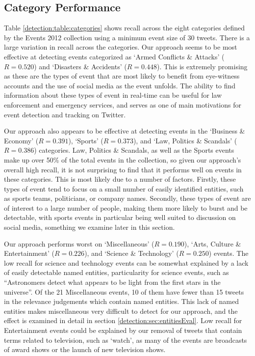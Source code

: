 \subsection{Category Performance}
Table \ref{detection:table:categories} shows recall across the eight categories defined by the Events 2012 collection using a minimum event size of 30 tweets.
There is a large variation in recall across the categories.
Our approach seems to be most effective at detecting events categorized as  `Armed Conflicts \& Attacks' ($R=0.520$) and `Disasters \& Accidents' ($R=0.448$).
This is extremely promising as these are the types of event that are most likely to benefit from eye-witness accounts and the use of social media as the event unfolds.
The ability to find information about these types of event in real-time can be useful for law enforcement and emergency services, and serves as one of main motivations for event detection and tracking on Twitter.

Our approach also appears to be effective at detecting events in the `Business \& Economy' ($R=0.391$), `Sports' ($R=0.373$), and `Law, Politics \& Scandals' ($R=0.386$) categories.
Law, Politics \& Scandals, as well as the Sports events make up over 50\% of the total events in the collection, so given our approach's overall high recall, it is not surprising to find that it performs well on events in these categories.
This is most likely due to a number of factors. Firstly, these types of event tend to focus on a small number of easily identified entities, such as sports teams, politicians, or company names.
Secondly, these types of event are of interest to a large number of people, making them more likely to burst and be detectable, with sports events in particular being well suited to discussion on social media, something we examine later in this section.

Our approach performs worst on `Miscellaneous' ($R=0.190$), `Arts, Culture \& Entertainment' ($R=0.226$), and `Science \& Technology' ($R=0.250$) events.
The low recall for science and technology events can be somewhat explained by a lack of easily detectable named entities, particularity for science events, such as ``Astronomers detect what appears to be light from the first stars in the universe''. Of the 21 Miscellaneous events, 10 of them have fewer than 15 tweets in the relevance judgements which contain named entities.
This lack of named entities makes miscellaneous very difficult to detect for our approach, and the effect is examined in detail in section \ref{detection:sec:entitiesEval}.
Low recall for Entertainment events could be explained by our removal of tweets that contain terms related to television, such as `watch', as many of the events are broadcasts of award shows or the launch of new television shows.

